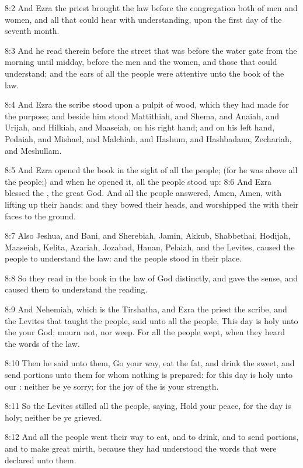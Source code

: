 8:2 And Ezra the priest brought the law before the congregation both
of men and women, and all that could hear with understanding, upon the
first day of the seventh month.

8:3 And he read therein before the street that was before the water
gate from the morning until midday, before the men and the women, and
those that could understand; and the ears of all the people were
attentive unto the book of the law.

8:4 And Ezra the scribe stood upon a pulpit of wood, which they had
made for the purpose; and beside him stood Mattithiah, and Shema, and
Anaiah, and Urijah, and Hilkiah, and Maaseiah, on his right hand; and
on his left hand, Pedaiah, and Mishael, and Malchiah, and Hashum, and
Hashbadana, Zechariah, and Meshullam.

8:5 And Ezra opened the book in the sight of all the people; (for he
was above all the people;) and when he opened it, all the people stood
up: 8:6 And Ezra blessed the \LORD, the great God. And all the people
answered, Amen, Amen, with lifting up their hands: and they bowed
their heads, and worshipped the \LORD with their faces to the ground.

8:7 Also Jeshua, and Bani, and Sherebiah, Jamin, Akkub, Shabbethai,
Hodijah, Maaseiah, Kelita, Azariah, Jozabad, Hanan, Pelaiah, and the
Levites, caused the people to understand the law: and the people stood
in their place.

8:8 So they read in the book in the law of God distinctly, and gave
the sense, and caused them to understand the reading.

8:9 And Nehemiah, which is the Tirshatha, and Ezra the priest the
scribe, and the Levites that taught the people, said unto all the
people, This day is holy unto the \LORD your God; mourn not, nor weep.
For all the people wept, when they heard the words of the law.

8:10 Then he said unto them, Go your way, eat the fat, and drink the
sweet, and send portions unto them for whom nothing is prepared: for
this day is holy unto our \LORD: neither be ye sorry; for the joy of
the \LORD is your strength.

8:11 So the Levites stilled all the people, saying, Hold your peace,
for the day is holy; neither be ye grieved.

8:12 And all the people went their way to eat, and to drink, and to
send portions, and to make great mirth, because they had understood
the words that were declared unto them.

